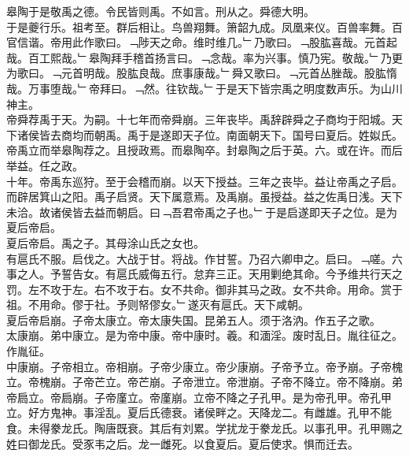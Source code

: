 \documentclass{zhvt-classic}
\begin{document}
\hspace*{2em}皋陶于是敬禹之德。令民皆则禹。不如言。刑从之。舜德大明。\\
\hspace*{2em}于是夔行乐。祖考至。群后相让。鸟兽翔舞。箫韶九成。凤凰来仪。百兽率舞。百官信谐。帝用此作歌曰。﹁陟天之命。维时维几。﹂乃歌曰。﹁股肱喜哉。元首起哉。百工熙哉。﹂皋陶拜手稽首扬言曰。﹁念哉。率为兴事。慎乃宪。敬哉。﹂乃更为歌曰。﹁元首明哉。股肱良哉。庶事康哉。﹂舜又歌曰。﹁元首丛脞哉。股肱惰哉。万事堕哉。﹂帝拜曰。﹁然。往钦哉。﹂于是天下皆宗禹之明度数声乐。为山川神主。\\
\hspace*{2em}帝舜荐禹于天。为嗣。十七年而帝舜崩。三年丧毕。禹辞辟舜之子商均于阳城。天下诸侯皆去商均而朝禹。禹于是遂即天子位。南面朝天下。国号曰夏后。姓姒氏。\\
\hspace*{2em}帝禹立而举皋陶荐之。且授政焉。而皋陶卒。封皋陶之后于英。六。或在许。而后举益。任之政。\\
\hspace*{2em}十年。帝禹东巡狩。至于会稽而崩。以天下授益。三年之丧毕。益让帝禹之子启。而辟居箕山之阳。禹子启贤。天下属意焉。及禹崩。虽授益。益之佐禹日浅。天下未洽。故诸侯皆去益而朝启。曰﹁吾君帝禹之子也。﹂于是启遂即天子之位。是为夏后帝启。\\
\hspace*{2em}夏后帝启。禹之子。其母涂山氏之女也。\\
\hspace*{2em}有扈氏不服。启伐之。大战于甘。将战。作甘誓。乃召六卿申之。启曰。﹁嗟。六事之人。予誓告女。有扈氏威侮五行。怠弃三正。天用剿绝其命。今予维共行天之罚。左不攻于左。右不攻于右。女不共命。御非其马之政。女不共命。用命。赏于祖。不用命。僇于社。予则帑僇女。﹂遂灭有扈氏。天下咸朝。\\
\hspace*{2em}夏后帝启崩。子帝太康立。帝太康失国。昆弟五人。须于洛汭。作五子之歌。\\
\hspace*{2em}太康崩。弟中康立。是为帝中康。帝中康时。羲。和湎淫。废时乱日。胤往征之。作胤征。\\
\hspace*{2em}中康崩。子帝相立。帝相崩。子帝少康立。帝少康崩。子帝予立。帝予崩。子帝槐立。帝槐崩。子帝芒立。帝芒崩。子帝泄立。帝泄崩。子帝不降立。帝不降崩。弟帝扃立。帝扃崩。子帝廑立。帝廑崩。立帝不降之子孔甲。是为帝孔甲。帝孔甲立。好方鬼神。事淫乱。夏后氏德衰。诸侯畔之。天降龙二。有雌雄。孔甲不能食。未得豢龙氏。陶唐既衰。其后有刘累。学扰龙于豢龙氏。以事孔甲。孔甲赐之姓曰御龙氏。受豕韦之后。龙一雌死。以食夏后。夏后使求。惧而迁去。\\
\end{document}
